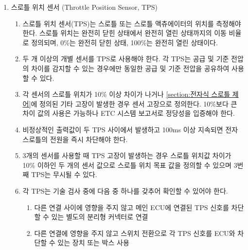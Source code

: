 \documentclass[final,a4paper,10pt]{report}
\begin{document}
\begin{enumerate}
\begin{enumerate}
      \item\label{rule:formula-technical.electronic-throttle-control.etcsf.denial-grounds} 별도로 공지된 보고서 제출 기한 내에 제출하지 않은 경우와 사용 목적, 사유가 타당하지 않을 경우 조직위원회에서 사용을 허가하지 않을 수 있다.
    \end{enumerate}

  \item\label{rule:formula-technical.electronic-throttle-control.tps} 스로틀 위치 센서 (Throttle Position Sensor, TPS)
    \begin{enumerate}
      \item\label{rule:formula-technical.electronic-throttle-control.tps.position-percentage-scale} 스로틀 위치 센서(TPS)는 스로틀 또는 스로틀 액츄에이터의 위치를 측정해야 한다. 스로틀 위치는 완전히 닫힌 상태에서 완전히 열린 상태까지의 이동 비율로 정의되며, 0\%는 완전히 닫힌 상태, 100\%는 완전히 열린 상태이다.
      \item\label{rule:formula-technical.electronic-throttle-control.tps.min-two-sensors} 두 개 이상의 개별 센서를 TPS로 사용해야 한다. 각 TPS는 공급 및 기준 전압의 차이를 감지할 수 있는 경우에만 동일한 공급 및 기준 전압을 공유하여 사용할 수 있다.
      \item\label{rule:formula-technical.electronic-throttle-control.tps.sensor-failure-10pct-diff} 각 센서의 스로틀 위치가 10\% 이상 차이가 나거나 \ref{section:전자식 스로틀 제어}에 정의된 기타 고장이 발생한 경우 센서 고장으로 정의한다. 10\%보다 큰 차이 값의 사용은 가능하나 ETC 시스템 보고서로 정당성을 입증해야 한다.
      \item\label{rule:formula-technical.electronic-throttle-control.tps.shutdown-after-100ms-mismatch} {\color{blue} 비정상적인 출력값이 두 TPS 사이에서 발생하고} 100ms 이상 지속되면 전자 스로틀의 전원을 즉시 차단해야 한다.
      \item\label{rule:formula-technical.electronic-throttle-control.tps.three-sensor-fallback} 3개의 센서를 사용할 때 TPS 고장이 발생하는 경우 {\color{blue} 스로틀 위치값 차이가 10\% 이하인} 두 개의 센서 값으로 스로틀 위치 목표 값을 정의할 수 있으며 3번째 TPS는 무시될 수 있다.

      \item\label{rule:formula-technical.electronic-throttle-control.tps.inspection-disconnect} 각 TPS는 기술 검사 중에 다음 중 하나를 갖추어 확인할 수 있어야 한다.
        \begin{enumerate}
          \item\label{rule:formula-technical.electronic-throttle-control.tps.inspection-disconnect.dedicated-connector} 다른 연결 사이에 영향을 주지 않고 {\color{blue} 메인 ECU에 연결된} TPS 신호를 {\color{blue} 차단할 수 있는} 별도의 분리형 커넥터로 연결
          \item\label{rule:formula-technical.electronic-throttle-control.tps.inspection-disconnect.switch-box} 다른 연결에 영향을 주지 않고 스위치 전환으로 각 TPS 신호를 ECU와 차단할 수 있는 장치 또는 박스 사용
        \end{enumerate}


\end{enumerate}
\end{enumerate}
\end{document}
